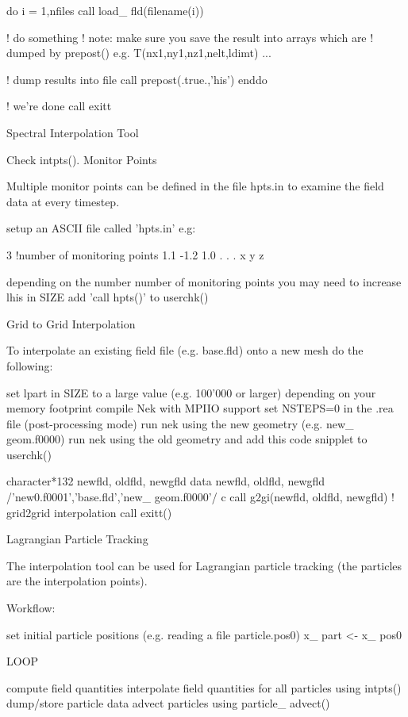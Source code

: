      do i = 1,nfiles
        call load\_ fld(filename(i))

        ! do something
        ! note: make sure you save the result into arrays which are
        !       dumped by prepost() e.g. T(nx1,ny1,nz1,nelt,ldimt)
        ...

        ! dump results into file
        call prepost(.true.,'his')
     enddo

     ! we're done
     call exitt

Spectral Interpolation Tool

Check intpts().
Monitor Points

Multiple monitor points can be defined in the file hpts.in to examine the field data at every timestep.

    setup an ASCII file called 'hpts.in' e.g: 

3 !number of monitoring points
1.1 -1.2 1.0
. . .
x y z

    depending on the number number of monitoring points you may need to increase lhis in SIZE
    add 'call hpts()' to userchk() 

Grid to Grid Interpolation

To interpolate an existing field file (e.g. base.fld) onto a new mesh do the following:

    set lpart in SIZE to a large value (e.g. 100'000 or larger) depending on your memory footprint
    compile Nek with MPIIO support
    set NSTEPS=0 in the .rea file (post-processing mode)
    run nek using the new geometry (e.g. new\_ geom.f0000)
    run nek using the old geometry and add this code snipplet to userchk() 

      character*132  newfld, oldfld, newgfld
      data newfld, oldfld, newgfld /'new0.f0001','base.fld','new\_ geom.f0000'/
c
      call g2gi(newfld, oldfld, newgfld) ! grid2grid interpolation
      call exitt()

Lagrangian Particle Tracking

The interpolation tool can be used for Lagrangian particle tracking (the particles are the interpolation points).

Workflow:

    set initial particle positions (e.g. reading a file particle.pos0) x\_ part <- x\_ pos0 

LOOP

    compute field quantities
    interpolate field quantities for all particles using intpts()
    dump/store particle data
    advect particles using particle\_ advect() 

